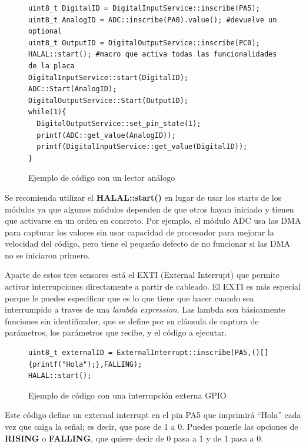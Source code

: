 \documentclass{report}
\begin{document}
\begin{figure}[h]
\begin{lstlisting}
uint8_t DigitalID = DigitalInputService::inscribe(PA5);
uint8_t AnalogID = ADC::inscribe(PA0).value(); #devuelve un optional
uint8_t OutputID = DigitalOutputService::inscribe(PC0);
HALAL::start(); #macro que activa todas las funcionalidades de la placa
DigitalInputService::start(DigitalID);
ADC::Start(AnalogID);
DigitalOutputService::Start(OutputID);
while(1){
  DigitalOutputService::set_pin_state(1);
  printf(ADC::get_value(AnalogID));
  printf(DigitalInputService::get_value(DigitalID));
}
\end{lstlisting}
\caption{Ejemplo de código con un lector análogo}
  \label{Analogcode}
\end{figure}
\par \vspace{0.3 cm}
Se recomienda utilizar el \textbf{HALAL::start()} en lugar de usar los starts de los módulos ya que algunos módulos dependen de que otros hayan iniciado y tienen que activarse en un orden en concreto. Por ejemplo, el módulo ADC usa las DMA para capturar los valores sin usar capacidad de procesador para mejorar la velocidad del código, pero tiene el pequeño defecto de no funcionar si las DMA no se iniciaron primero. 
\par \vspace{0.3 cm}
Aparte de estos tres sensores está el EXTI (External Interrupt) que permite activar interrupciones directamente a partir de cableado. El EXTI es más especial porque le puedes especificar que es lo que tiene que hacer cuando sea interrumpido a traves de una \textit{lambda expression}. Las lambda son básicamente funciones sin identificador, que se define por su cláusula de captura de parámetros, los parámetros que recibe, y el código a ejecutar. 
\begin{figure}[h]
\begin{lstlisting}
uint8_t externalID = ExternalInterrupt::inscribe(PA5,()[]{printf("Hola");},FALLING);
HALAL::start();
\end{lstlisting} 
\caption{Ejemplo de código con una interrupción externa GPIO}
  \label{EXTIcode}
\end{figure}
\par \vspace{0.3 cm}
Este código define un external interrupt en el pin PA5 que imprimirá ``Hola'' cada vez que caiga la señal; es decir, que pase de 1 a 0. Puedes ponerle las opciones de \textbf{RISING} o \textbf{FALLING}, que quiere decir de 0 pasa a 1 y de 1 pasa a 0. \par\vspace{0.3 cm}
\end{document}
